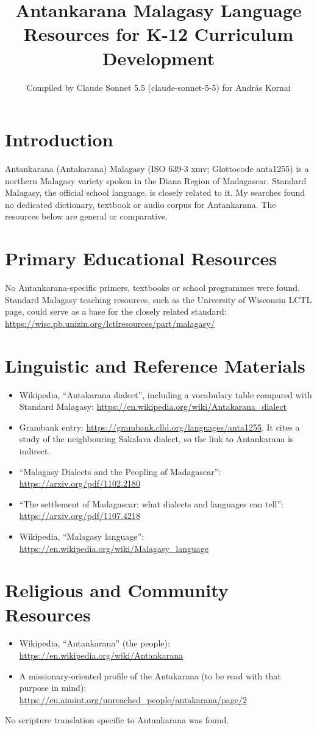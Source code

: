 \documentclass[12pt]{article}
\title{Antankarana Malagasy Language Resources for K-12 Curriculum Development}
\author{Compiled by Claude Sonnet 5.5 (claude-sonnet-5-5) for Andr\'as Kornai}
\date{}
\begin{document}
\maketitle

\section{Introduction}
Antankarana (Antakarana) Malagasy (ISO 639-3 xmv; Glottocode anta1255) is a northern Malagasy variety spoken in the Diana Region of Madagascar. Standard Malagasy, the official school language, is closely related to it. My searches found no dedicated dictionary, textbook or audio corpus for Antankarana. The resources below are general or comparative.

\section{Primary Educational Resources}
No Antankarana-specific primers, textbooks or school programmes were found. Standard Malagasy teaching resources, such as the University of Wisconsin LCTL page, could serve as a base for the closely related standard: \url{https://wisc.pb.unizin.org/lctlresources/part/malagasy/}

\section{Linguistic and Reference Materials}
\begin{itemize}
\item Wikipedia, ``Antakarana dialect'', including a vocabulary table compared with Standard Malagasy: \url{https://en.wikipedia.org/wiki/Antakarana_dialect}
\item Grambank entry: \url{https://grambank.clld.org/languages/anta1255}. It cites a study of the neighbouring Sakalava dialect, so the link to Antankarana is indirect.
\item ``Malagasy Dialects and the Peopling of Madagascar'': \url{https://arxiv.org/pdf/1102.2180}
\item ``The settlement of Madagascar: what dialects and languages can tell'': \url{https://arxiv.org/pdf/1107.4218}
\item Wikipedia, ``Malagasy language'': \url{https://en.wikipedia.org/wiki/Malagasy_language}
\end{itemize}

\section{Religious and Community Resources}
\begin{itemize}
\item Wikipedia, ``Antankarana'' (the people): \url{https://en.wikipedia.org/wiki/Antankarana}
\item A missionary-oriented profile of the Antakarana (to be read with that purpose in mind): \url{https://eu.aimint.org/unreached_people/antakarana/page/2}
\end{itemize}
No scripture translation specific to Antankarana was found.
\end{document}
